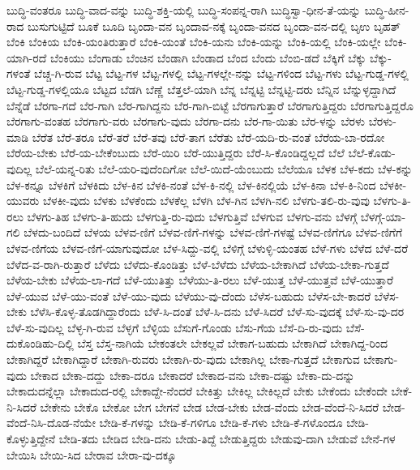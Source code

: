 {ಬುದ್ಧಿ-ವಂತರೂ
ಬುದ್ಧಿ-ವಾದ-ವನ್ನು
ಬುದ್ಧಿ-ಶಕ್ತಿ-ಯಲ್ಲಿ
ಬುದ್ಧಿ-ಸಂಪನ್ನ-ರಾಗಿ
ಬುದ್ಧಿಸ್ವಾ-ಧೀನ-ತೆ-ಯನ್ನು
ಬುದ್ಧಿ-ಹೀನ-ರಾದ
ಬುಸುಗುಟ್ಟಿದೆ
ಬೂಕೆ
ಬೂದಿ
ಬೃಂದಾ-ವನ
ಬೃಂದಾವ-ನಕ್ಕೆ
ಬೃಂದಾ-ವನದ
ಬೃಂದಾ-ವನ-ದಲ್ಲಿ
ಬೃಉ
ಬೃಹತ್
ಬೆಂಕಿ
ಬೆಂಕಿಯ
ಬೆಂಕಿ-ಯಂತಿರುತ್ತಾರೆ
ಬೆಂಕಿ-ಯಂತೆ
ಬೆಂಕಿ-ಯನು
ಬೆಂಕಿ-ಯನ್ನು
ಬೆಂಕಿ-ಯಲ್ಲಿ
ಬೆಂಕಿ-ಯಲ್ಲೇ
ಬೆಂಕಿ-ಯಾಗಿ-ರದೆ
ಬೆಂಕಿಯು
ಬೆಂಗಾಡು
ಬೆಂಚಿನ
ಬೆಂಡಾಗಿ
ಬೆಂಡಾದ
ಬೆಂದ
ಬೆಂದು
ಬೆಂಬಿ-ಡದೆ
ಬೆಕ್ಕಿಗೆ
ಬೆಕ್ಕು
ಬೆಕ್ಕು-ಗಳಂತೆ
ಬೆಚ್ಚ-ಗಿ-ರುವ
ಬೆಟ್ಟ
ಬೆಟ್ಟ-ಗಳ
ಬೆಟ್ಟ-ಗಳಲ್ಲಿ
ಬೆಟ್ಟ-ಗಳಲ್ಲೇ-ನನ್ನು
ಬೆಟ್ಟ-ಗಳಿಂದ
ಬೆಟ್ಟ-ಗಳು
ಬೆಟ್ಟ-ಗುಡ್ಡ-ಗಳಲ್ಲಿ
ಬೆಟ್ಟ-ಗುಡ್ಡ-ಗಳಲ್ಲಿಯೂ
ಬೆಟ್ಟದ
ಬೆಡಗಿ
ಬೆಣ್ಣೆ
ಬೆತ್ತಲೆ-ಯಾಗಿ
ಬೆನ್ನ
ಬೆನ್ನಟ್ಟಿ
ಬೆನ್ನಟ್ಟಿ-ದರು
ಬೆನ್ನಿನ
ಬೆನ್ನುಳ್ಳದ್ದಾಗಿದೆ
ಬೆನ್ನೆಡೆ
ಬೆರಗಾ-ಗದೆ
ಬೆರ-ಗಾಗಿ
ಬೆರ-ಗಾಗಿದ್ದನು
ಬೆರ-ಗಾಗಿ-ಬಿಟ್ಟೆ
ಬೆರಗಾಗುತ್ತಾರೆ
ಬೆರಗಾಗುತ್ತಿದ್ದರು
ಬೆರಗಾಗುತ್ತಿದ್ದರೊ
ಬೆರಗಾಗು-ವಂತಹ
ಬೆರಗಾಗು-ವರು
ಬೆರಗಾಗು-ವುದು
ಬೆರಗಾ-ದನು
ಬೆರ-ಗಾ-ಯಿತು
ಬೆರ-ಳನ್ನು
ಬೆರಳು
ಬೆರಳು-ಮಾಡಿ
ಬೆರೆತ
ಬೆರೆ-ತರೂ
ಬೆರೆ-ತರೆ
ಬೆರೆ-ತವು
ಬೆರೆ-ತಾಗ
ಬೆರೆತು
ಬೆರೆ-ಯದಿ-ರು-ವಂತೆ
ಬೆರೆಯ-ಬಾ-ರದೋ
ಬೆರೆಯ-ಬೇಕು
ಬೆರೆ-ಯ-ಬೇಕೆಂಬುದು
ಬೆರೆ-ಯಿರಿ
ಬೆರೆ-ಯುತ್ತಿದ್ದರು
ಬೆರೆ-ಸಿ-ಕೊಂಡಿದ್ದಲ್ಲದೆ
ಬೆಲೆ
ಬೆಲೆ-ಕೊಡು-ವುದಿಲ್ಲ
ಬೆಲೆ-ಯನ್ನ-ರಿತು
ಬೆಲೆ-ಯರಿ-ವುದೆಂದಿಗೋ
ಬೆಲೆ-ಯಿದೆ-ಯೆಂಬುದು
ಬೆಲೆಯೂ
ಬೆಳಕ
ಬೆಳ-ಕದು
ಬೆಳ-ಕನ್ನು
ಬೆಳ-ಕನ್ನೂ
ಬೆಳಕಿಗೆ
ಬೆಳಕಿದು
ಬೆಳ-ಕಿನ
ಬೆಳಕಿ-ನಂತೆ
ಬೆಳ-ಕಿ-ನಲ್ಲಿ
ಬೆಳ-ಕಿನಲ್ಲಿಯೆ
ಬೆಳ-ಕಿನಾ
ಬೆಳ-ಕಿ-ನಿಂದ
ಬೆಳಕೀ-ಯುವರು
ಬೆಳಕೀ-ವುದು
ಬೆಳಕು
ಬೆಳಕೆಂದು
ಬೆಳಕೆಲ್ಲ
ಬೆಳಗಿ
ಬೆಳ-ಗಿನ
ಬೆಳಗಿ-ನಲಿ
ಬೆಳಗು-ತಲಿ-ರು-ವುವು
ಬೆಳಗು-ತಿ-ರಲು
ಬೆಳಗು-ತಿಹ
ಬೆಳಗು-ತಿ-ಹುದು
ಬೆಳಗುತ್ತಿ-ರು-ವುದು
ಬೆಳಗುತ್ತಿವೆ
ಬೆಳಗುವ
ಬೆಳಗು-ವನು
ಬೆಳಗ್ಗೆ
ಬೆಳಗ್ಗೆ-ಯಾ-ಗಲಿ
ಬೆಳದು-ಬಂದಿದೆ
ಬೆಳಯ
ಬೆಳವ-ಣಿಗೆ
ಬೆಳವ-ಣಿಗೆ-ಗಳನ್ನು
ಬೆಳವ-ಣಿಗೆ-ಗಳಷ್ಟೆ
ಬೆಳವ-ಣಿಗೆಗೂ
ಬೆಳವ-ಣಿಗೆಗೆ
ಬೆಳವ-ಣಿಗೆಯ
ಬೆಳವ-ಣಿಗೆ-ಯಾಗುವುದೋ
ಬೆಳ-ಸಿದ್ದು-ವಲ್ಲಿ
ಬೆಳಿಗ್ಗೆ
ಬೆಳುಳ್ಳಿ-ಯಂತಹ
ಬೆಳೆ-ಗಳು
ಬೆಳೆದ
ಬೆಳೆ-ದರೆ
ಬೆಳೆದ-ವ-ರಾಗಿ-ರುತ್ತಾರೆ
ಬೆಳೆದು
ಬೆಳೆದು-ಕೊಂಡಿತ್ತು
ಬೆಳೆ-ಬೆಳೆದು
ಬೆಳೆಯ-ಬೇಕಾಗಿದೆ
ಬೆಳೆಯ-ಬೇಕಾ-ಗುತ್ತದೆ
ಬೆಳೆಯ-ಬೇಕು
ಬೆಳೆಯ-ಲಾ-ಗದೆ
ಬೆಳೆ-ಯುತಿತ್ತು
ಬೆಳೆಯು-ತಿ-ರಲು
ಬೆಳೆ-ಯುತ್ತ
ಬೆಳೆ-ಯುತ್ತವೆ
ಬೆಳೆ-ಯುತ್ತಾರೆ
ಬೆಳೆ-ಯುವ
ಬೆಳೆ-ಯು-ವಂತೆ
ಬೆಳೆ-ಯು-ವುದು
ಬೆಳೆಯು-ವು-ದೆಂದು
ಬೆಳೆಸ-ಬಹುದು
ಬೆಳೆಸ-ಬೇ-ಕಾದರೆ
ಬೆಳೆಸ-ಬೇಕು
ಬೆಳೆಸಿ-ಕೊಳ್ಳ-ತೊಡಗಿದ್ದಾರೆಂದು
ಬೆಳೆ-ಸಿ-ದಂತೆ
ಬೆಳೆ-ಸಿ-ದನು
ಬೆಳೆ-ಸಿದರೆ
ಬೆಳೆ-ಸು-ವುದಕ್ಕೆ
ಬೆಳೆ-ಸು-ವು-ದರ
ಬೆಳೆ-ಸು-ವುದಿಲ್ಲ
ಬೆಳ್ಳ-ಗಿ-ರುವ
ಬೆಳ್ಳಗೆ
ಬೆಳ್ಳಿಯ
ಬೆಸುಗೆ-ಗೊಂಡು
ಬೆಸು-ಗೆಯ
ಬೆಸೆ-ದಿ-ರು-ವುದು
ಬೆಸೆ-ದುಕೊಂಡಿಹು-ದಿಲ್ಲಿ
ಬೆಸ್ತ
ಬೆಸ್ತ-ನಾಗಿಯೆ
ಬೇಕಂತಲೇ
ಬೇಕಲ್ಲವೆ
ಬೇಕಾಗ-ಬಹುದು
ಬೇಕಾಗಿದೆ
ಬೇಕಾಗಿದ್ದ-ರಿಂದ
ಬೇಕಾಗಿದ್ದರೆ
ಬೇಕಾಗಿದ್ದಾರೆ
ಬೇಕಾಗಿ-ರುವರು
ಬೇಕಾಗಿ-ರು-ವುದು
ಬೇಕಾಗಿಲ್ಲ
ಬೇಕಾ-ಗುತ್ತದೆ
ಬೇಕಾಗುವ
ಬೇಕಾಗು-ವುದು
ಬೇಕಾದ
ಬೇಕಾ-ದದ್ದು
ಬೇಕಾ-ದರೂ
ಬೇಕಾದರೆ
ಬೇಕಾದ-ವನು
ಬೇಕಾ-ದಷ್ಟು
ಬೇಕಾ-ದು-ದನ್ನು
ಬೇಕಾದುದನ್ನೆಲ್ಲಾ
ಬೇಕಾದುದ-ರಲ್ಲಿ
ಬೇಕಾದ್ದೇ-ನೆಂದರೆ
ಬೇಕಿತ್ತು
ಬೇಕಿಲ್ಲ
ಬೇಕಿಲ್ಲದೆ
ಬೇಕು
ಬೇಕೆಂದು
ಬೇಕೆಂದೇ
ಬೇಕೆ-ನಿ-ಸಿದರೆ
ಬೇಕೇನು
ಬೇಕೊ
ಬೇಕೋ
ಬೇಗ
ಬೇಗನೆ
ಬೇಡ
ಬೇಡ-ಬೇಕು
ಬೇಡ-ವೆಂದು
ಬೇಡ-ವೆಂದೆ-ನಿ-ಸಿದರೆ
ಬೇಡ-ವೆಂದೆ-ನಿಸಿ-ದೊಡ-ನೆಯೇ
ಬೇಡಿ-ಕೆ-ಗಳನ್ನು
ಬೇಡಿ-ಕೆ-ಗಳಿಗೂ
ಬೇಡಿ-ಕೆ-ಗಳು
ಬೇಡಿ-ಕೆ-ಗಳೊಂದೂ
ಬೇಡಿ-ಕೊಳ್ಳುತ್ತಿದ್ದೇನೆ
ಬೇಡಿ-ತದು
ಬೇಡಿದ
ಬೇಡಿ-ದನು
ಬೇಡು-ತಿದ್ದೆ
ಬೇಡುತ್ತಿದ್ದರು
ಬೇಡುವು-ದಾಗಿ
ಬೇಡುವೆ
ಬೇನೆ-ಗಳ
ಬೇಯಿಸಿ
ಬೇಯಿ-ಸಿದ
ಬೇರಾವ
ಬೇರಾ-ವು-ದಕ್ಕೂ
}
